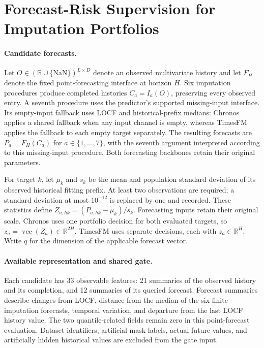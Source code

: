 \section{Forecast-Risk Supervision for Imputation Portfolios}
\label{sec:forecast_gate}

\paragraph{Candidate forecasts.}
Let $O\in(\mathbb{R}\cup\{\mathrm{NaN}\})^{L\times D}$ denote an observed multivariate history and let $F_H$ denote the fixed point-forecasting interface at horizon $H$. Six imputation procedures produce completed histories $C_a=I_a(O)$, preserving every observed entry. A seventh procedure uses the predictor's supported missing-input interface. Its empty-input fallback uses LOCF and historical-prefix medians: Chronos applies a shared fallback when any input channel is empty, whereas TimesFM applies the fallback to each empty target separately. The resulting forecasts are $P_a=F_H(C_a)$ for $a\in\{1,\ldots,7\}$, with the seventh argument interpreted according to this missing-input procedure. Both forecasting backbones retain their original parameters.

For target $k$, let $\mu_k$ and $s_k$ be the mean and population standard deviation of its observed historical fitting prefix. At least two observations are required; a standard deviation at most $10^{-12}$ is replaced by one and recorded. These statistics define $Z_{a,hk}=(P_{a,hk}-\mu_k)/s_k$. Forecasting inputs retain their original scale. Chronos uses one portfolio decision for both evaluated targets, so $z_a=\operatorname{vec}(Z_a)\in\mathbb{R}^{2H}$. TimesFM uses separate decisions, each with $z_a\in\mathbb{R}^{H}$. Write $q$ for the dimension of the applicable forecast vector.

\paragraph{Available representation and shared gate.}
Each candidate has 33 observable features: 21 summaries of the observed history and its completion, and 12 summaries of its queried forecast. Forecast summaries describe changes from LOCF, distance from the median of the six finite-imputation forecasts, temporal variation, and departure from the last LOCF history value. The two quantile-related fields remain zero in this point-forecast evaluation. Dataset identifiers, artificial-mask labels, actual future values, and artificially hidden historical values are excluded from the gate input.

